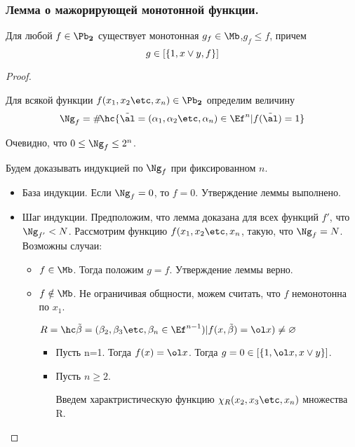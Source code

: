 \documentclass[unicode, 10pt, a4paper, oneside, fleqn]{article}
\begin{document}
\subsubsection{Лемма о мажорирующей монотонной функции.}
\begin{lemma}
  Для любой $f\in\PD$ существует монотонная $g_f\in\Mb$,$g_f\le f$, причем
  \begin{displaymath}
    g\in[\{1,x\vee{y},f\}]
  \end{displaymath}
\end{lemma}
\begin{proof}
  \begin{denote}
    Для всякой функции $f(\set[x]{n})\in\PD$ определим величину
    \begin{displaymath}
      \Ng_f=\#\!\hc{\alt=(\set{n})\in\Ef^n|f(\alt)=1}
    \end{displaymath}
    \begin{center}
      Очевидно, что $0\le\Ng_f\le2^n$.
    \end{center}
  \end{denote}
  Будем доказывать индукцией по $\Ng_f$ при фиксированном $n$.
  \begin{itemize}
    \item База индукции. Если $\Ng_f=0$, то $f=0$. Утверждение леммы выполнено.
    \item Шаг индукции. Предположим, что лемма доказана для всех функций $f'$, что $\Ng_{f'}<N$.
      Рассмотрим функцию $f(\set[x]{n}$, такую, что $\Ng_f=N$. Возможны случаи:
      \begin{itemize}
        \item $f\in\Mb$. Тогда положим $g=f$. Утверждение леммы верно.
        \item $f\notin\Mb$. Не ограничивая общности, можем считать, что $f$ немонотонна по $x_1$.
          \begin{denote}
            \begin{math}
              R = \setof{\tilde\beta=(\setf[\beta]{n}\in\Ef^{n-1})}{f(x,\tilde\beta)=\ol x)}\neq\varnothing
            \end{math}
          \end{denote}
          \begin{itemize}
            \item Пусть n=1. Тогда $f(x)=\ol x$. Тогда $g=0\in\cls{1,\ol x,\dn}$.
            \item Пусть $n\ge2$.
              \begin{denote}
                Введем характристическую функцию $\chi_R(\setf[x]{n})$ множества R.

\end{denote}
\end{itemize}
\end{itemize}
\end{itemize}
\end{proof}
\end{document}

